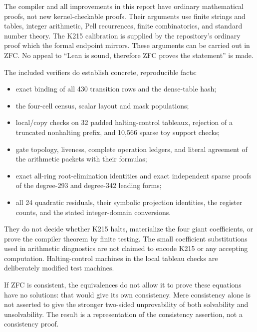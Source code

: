 \documentclass[11pt,a4paper]{article}
\theoremstyle{remark}\newtheorem{remark}[theorem]{Remark}
\begin{document}
The compiler and all improvements in this report have ordinary
mathematical proofs, not new kernel-checkable proofs. Their arguments
use finite strings and tables, integer arithmetic, Pell recurrences,
finite combinatorics, and standard number theory. The K215 calibration
is supplied by the repository's ordinary proof which the formal endpoint
mirrors. These arguments can be carried out in ZFC. No appeal to
``Lean is sound, therefore ZFC proves the statement'' is made.

The included verifiers do establish concrete, reproducible facts:
\begin{itemize}
\item exact binding of all 430 transition rows and the dense-table hash;
\item the four-cell census, scalar layout and mask populations;
\item local/copy checks on 32 padded halting-control tableaux, rejection
of a truncated nonhalting prefix, and 10,566 sparse toy support checks;
\item gate topology, liveness, complete operation ledgers, and literal
agreement of the arithmetic packets with their formulas;
\item exact all-ring root-elimination identities and exact independent
sparse proofs of the degree-293 and degree-342 leading forms;
\item all 24 quadratic residuals, their symbolic projection identities,
the register counts, and the stated integer-domain conversions.
\end{itemize}
They do not decide whether K215 halts, materialize the four giant
coefficients, or prove the compiler theorem by finite testing. The small
coefficient substitutions used in arithmetic diagnostics are not claimed
to encode K215 or any accepting computation. Halting-control machines in
the local tableau checks are deliberately modified test machines.

If ZFC is consistent, the equivalences do not allow it to prove these
equations have no solutions: that would give its own consistency.
Mere consistency alone is not asserted to give the stronger two-sided
unprovability of both solvability and unsolvability. The result is a
representation of the consistency assertion, not a consistency proof.
\end{document}
